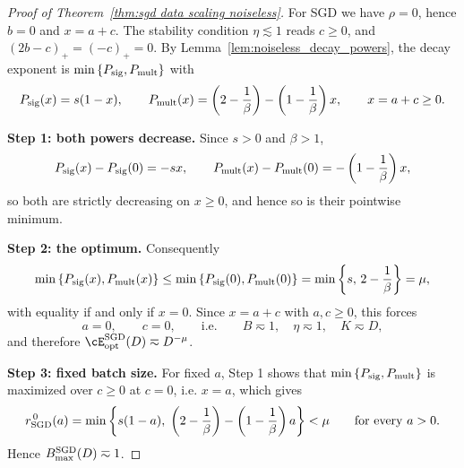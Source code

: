 \begin{proof}[Proof of Theorem~\ref{thm:sgd data scaling noiseless}]
For SGD we have \(\rho=0\), hence \(b=0\) and \(x=a+c\). The stability condition \(\eta\lesssim1\) reads \(c\geq0\), and $\left(2b-c\right)_{+}=\left(-c\right)_{+}=0.$
By Lemma~\ref{lem:noiseless_decay_powers}, the decay exponent is \(\min\left\{P_{\rm sig},P_{\rm mult}\right\}\) with
\[
    P_{\rm sig}(x)=s(1-x),
    \qquad
    P_{\rm mult}(x)=\left(2-\frac1\beta\right)-\left(1-\frac1\beta\right)x,
    \qquad
    x=a+c\geq0.
\]

\textbf{Step 1: both powers decrease.} Since \(s>0\) and \(\beta>1\),
\[
    P_{\rm sig}(x)-P_{\rm sig}(0)=-sx,
    \qquad
    P_{\rm mult}(x)-P_{\rm mult}(0)=-\left(1-\frac1\beta\right)x,
\]
so both are strictly decreasing on \(x\geq0\), and hence so is their pointwise minimum.

\textbf{Step 2: the optimum.} Consequently
\[
    \min\left\{P_{\rm sig}(x),P_{\rm mult}(x)\right\}
    \leq
    \min\left\{P_{\rm sig}(0),P_{\rm mult}(0)\right\}
    =
    \min\left\{s,\,2-\frac1\beta\right\}
    =
    \mu,
\]
with equality if and only if \(x=0\). Since \(x=a+c\) with \(a,c\geq0\), this forces
\[
    a=0,
    \qquad
    c=0,
    \qquad\text{i.e.}\qquad
    B\eqsim1,
    \quad
    \eta\eqsim1,
    \quad
    K\eqsim D,
\]
and therefore \(\cE_{\rm opt}^{\rm SGD}(D)\eqsim D^{-\mu}\).

\textbf{Step 3: fixed batch size.} For fixed \(a\), Step 1 shows that \(\min\left\{P_{\rm sig},P_{\rm mult}\right\}\) is maximized over \(c\geq0\) at \(c=0\), i.e. \(x=a\), which gives
\[
    r_{\rm SGD}^{\,0}(a)
    =
    \min\left\{
        s(1-a),\;
        \left(2-\frac1\beta\right)-\left(1-\frac1\beta\right)a
    \right\}
    <
    \mu
    \qquad\text{for every }a>0 .
\]
Hence \(B_{\max}^{\rm SGD}(D)\eqsim1\).
\end{proof}

